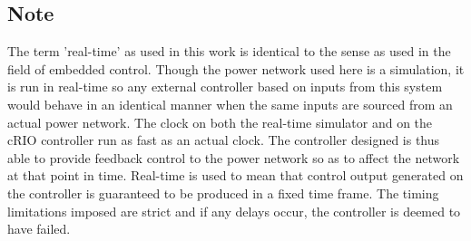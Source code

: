 \documentclass[conference]{IEEEtran}
\begin{document}

\subsection*{Note}
The term 'real-time' as used in this work is identical to the sense as used in the field of embedded control\cite{Real-Time}. Though the power network used here is a simulation, it is run in real-time so any external controller based on inputs from this system would behave in an identical manner when the same inputs are sourced from an actual power network. The clock on both the real-time simulator and on the cRIO controller run as fast as an actual clock. The controller
designed is thus able to provide feedback control to the power network so as to affect the network at that point in time. Real-time is used to mean that control output generated on the controller is guaranteed to be produced in a fixed time frame. The timing limitations imposed are strict and if any delays occur, the controller is deemed to have failed. 



\end{document}
